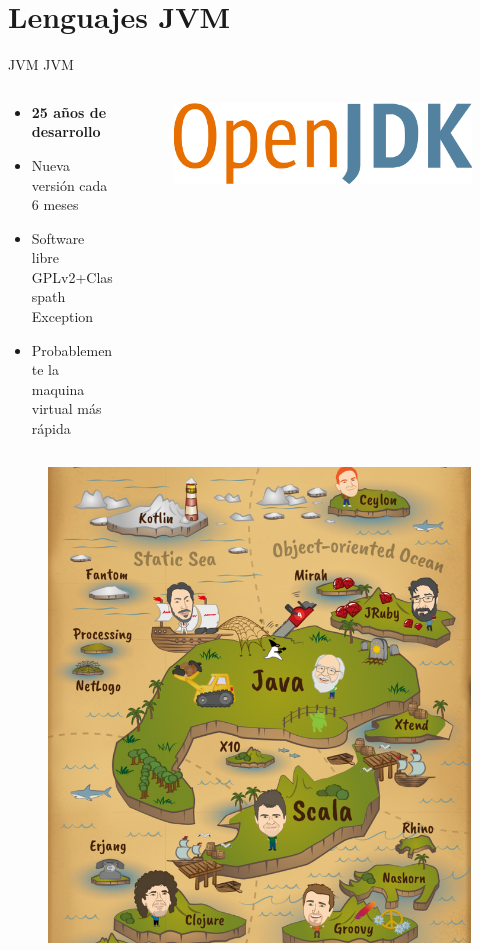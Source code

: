 \documentclass[aspectratio=169]{beamer}
\begin{document}
\section{Lenguajes JVM}
\begin{frame}{JVM}
	JVM
	
	\begin{columns}[T] %
		\begin{column}[T]{0.5\textwidth} %
			\begin{itemize}
				\item \textbf{25 años de desarrollo}
				\item Nueva versión cada 6 meses
				\item Software libre GPLv2+Classpath Exception
				\item Probablemente la maquina virtual más rápida
			\end{itemize}
		\end{column}
		\begin{column}[T]{7cm} %
			\begin{figure}
				\centering
				\includegraphics[width=\linewidth]{Images/openjdk}
			\end{figure}
			
		\end{column}
	\end{columns}
\end{frame}
\begin{frame}{}
	\begin{figure}
		\centering
		\includegraphics[width=0.5\linewidth]{Images/pirates}
	\end{figure}
	
\end{frame}
\end{document}
